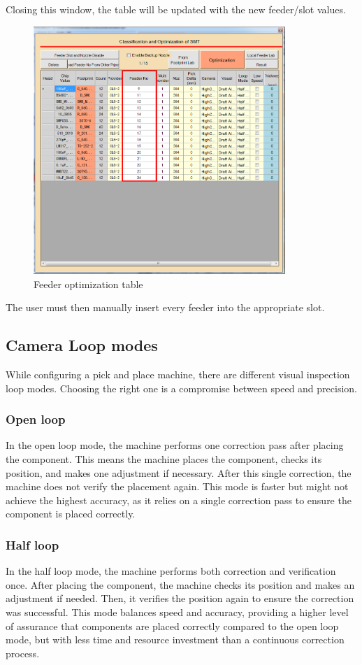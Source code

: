 \documentclass[a4paper,10pt]{report}
\begin{document}
Closing this window, the table will be updated with the new feeder/slot values.
\begin{figure}[!htb]
 \centering
 \includegraphics[width=0.85\textwidth]{images/scrot20.png}
 \caption{Feeder optimization table}
\end{figure}
The user must then manually insert every feeder into the appropriate slot.
\newpage
\subsection{Camera Loop modes}
\label{sec:loop}
While configuring a pick and place machine, there are different visual inspection loop modes. Choosing the right one is a compromise between speed and precision.
\subsubsection{Open loop}
In the open loop mode, the machine performs one correction pass after placing the component. This means the machine places the component, checks its position, and makes one adjustment if necessary. After this single correction, the machine does not verify the placement again. This mode is faster but might not achieve the highest accuracy, as it relies on a single correction pass to ensure the component is placed correctly.
\subsubsection{Half loop}
In the half loop mode, the machine performs both correction and verification once. After placing the component, the machine checks its position and makes an adjustment if needed. Then, it verifies the position again to ensure the correction was successful. This mode balances speed and accuracy, providing a higher level of assurance that components are placed correctly compared to the open loop mode, but with less time and resource investment than a continuous correction process.
\end{document}
